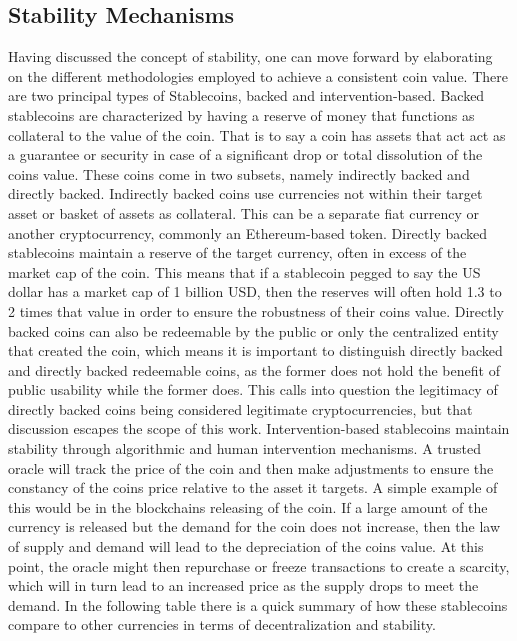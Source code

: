 \documentclass[bsc,frontabs,singlespacing,parskip,deptreport]{infthesis}
\begin{document}
    \subsection{Stability Mechanisms}
    Having discussed the concept of stability, one can move forward by elaborating on the different methodologies employed to achieve a consistent coin value. There are two principal types of Stablecoins, backed and intervention-based.
    \smallbreak \noindent
    Backed stablecoins are characterized by having a reserve of money that functions as collateral to the value of the coin. That is to say a coin has assets that act act as a guarantee or security in case of a significant drop or total dissolution of the coins value. These coins come in two subsets, namely indirectly backed and directly backed. Indirectly backed coins use currencies not within their target asset or basket of assets as collateral. This can be a separate fiat currency or another cryptocurrency, commonly an Ethereum-based token. Directly backed stablecoins maintain a reserve of the target currency, often in excess of the market cap of the coin. This means that if a stablecoin pegged to say the US dollar has a market cap of 1 billion USD, then the reserves will often hold 1.3 to 2 times that value in order to ensure the robustness of their coins value. Directly backed coins can also be redeemable by the public or only the centralized entity that created the coin, which means it is important to distinguish directly backed and directly backed redeemable coins, as the former does not hold the benefit of public usability while the former does. This calls into question the legitimacy of directly backed coins being considered legitimate cryptocurrencies, but that discussion escapes the scope of this work.
    \smallbreak
    \noindent 
    Intervention-based stablecoins maintain stability through algorithmic and human intervention mechanisms. A trusted oracle will track the price of the coin and then make adjustments to ensure the constancy of the coins price relative to the asset it targets. A simple example of this would be in the blockchains releasing of the coin. If a large amount of the currency is released but the demand for the coin does not increase, then the law of supply and demand will lead to the depreciation of the coins value. At this point, the oracle might then repurchase or freeze transactions to create a scarcity, which will in turn lead to an increased price as the supply drops to meet the demand. In the following table there is a quick summary of how these stablecoins compare to other currencies in terms of decentralization and stability.
\end{document}
